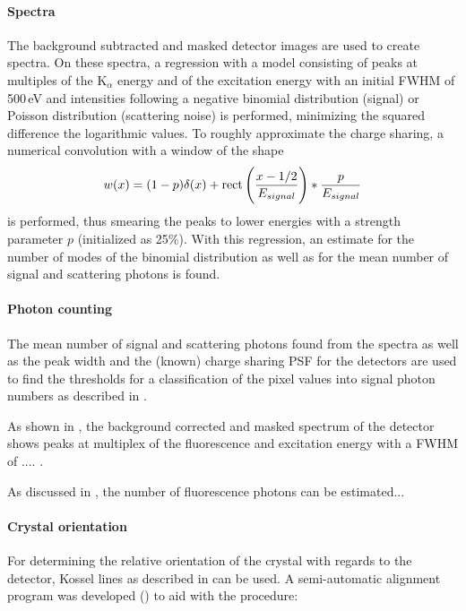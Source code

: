 \paragraph{Spectra}
The background subtracted and masked detector images are used to create spectra. On these spectra, a regression with a model consisting of peaks at multiples of the K$_\alpha$ energy and of the excitation energy with an initial FWHM of 500\,eV and intensities following a negative binomial distribution (signal) or Poisson distribution (scattering noise) is performed, minimizing the squared difference the logarithmic values. To roughly approximate the charge sharing, a numerical convolution with a  window of the shape
\begin{equation}
	w (x)= (1-p)\delta(x)+\operatorname{rect}\left(\frac{x-1/2}{E_{signal}}\right)*\frac{p}{E_{signal}}
\end{equation}
is performed, thus smearing the peaks to lower energies with a strength parameter $p$ (initialized as 25\%).
With this regression, an estimate for the number of modes of the binomial distribution as well as for the mean number of signal and scattering photons is found.

\paragraph{Photon counting}

The mean number of signal and scattering photons found from the spectra as well as the peak width and the (known) charge sharing PSF for the detectors are used to find the thresholds for a classification of the pixel values into signal photon numbers as described in .






As shown in , the background corrected and masked spectrum of the detector shows peaks at multiplex of the fluorescence and excitation energy with a FWHM of .... . 


As discussed in , the number of fluorescence photons can be estimated...




\paragraph{Crystal orientation}
For determining the relative orientation of the crystal with regards to the detector, Kossel lines as described in  can be used.  A semi-automatic alignment program was developed () to aid with the procedure: 

